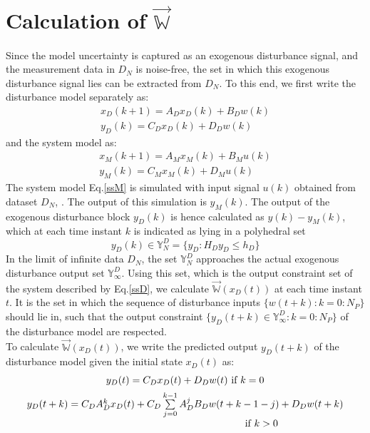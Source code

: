 \documentclass[letterpaper, 10 pt, conference]{ieeeconf}  %
\begin{document}
  \section{Calculation of $\vec{\mathbb{W}}$}
  \noindent
  Since the model uncertainty is captured as an exogenous disturbance signal, and the measurement data in $D_N$ is noise-free, the set in which this exogenous disturbance signal lies can be extracted from $D_N$. To this end, we first write 
  the disturbance model separately as:
  \begin{equation}
  \begin{matrix}
  x_D(k+1) = A_Dx_D(k)+B_Dw(k)  \\
  y_D(k) = C_Dx_D(k)+D_Dw(k)
  \end{matrix}
  \label{ssD}
  \end{equation}
  and the system model as:
  \begin{equation}
  \begin{matrix}
  x_M(k+1) = A_Mx_M(k)+B_Mu(k)  \\
  y_M(k) = C_Mx_M(k)+D_Mu(k)
  \end{matrix}
  \label{ssM}
  \end{equation}
	The system model Eq.\eqref{ssM} is simulated with input signal $u(k)$ obtained from dataset $D_N$, {\color{red}{with the initial condition $x_M(0)=0$}}.
	The output of this simulation is $y_M(k)$. The output of the exogenous disturbance block $y_D(k)$ is hence calculated as $y(k)-y_M(k)$, which at each time instant $k$ is indicated as lying in a polyhedral set
	\begin{equation}
	y_D(k) \in \mathbb{Y}^D_N = \{y_D:H_Dy_D \leq h_D\}
	\end{equation}
	In the limit of infinite data $D_N$, the set $\mathbb{Y}_N^D$ approaches the actual exogenous disturbance output set $\mathbb{Y}_{\infty}^D$. Using this set, which is the output constraint set of the system described by Eq.\eqref{ssD}, we calculate $\vec{\mathbb{W}}(x_D(t))$ at each time instant $t$. It is the set in which the sequence of disturbance inputs $\{w(t+k):k=0:N_P\}$ should lie in, such that the output constraint $\{y_D(t+k)\in \mathbb{Y}_{\infty}^D:k=0:N_P\}$ of the disturbance model are respected. \\
	To calculate $\vec{\mathbb{W}}(x_D(t))$, we write the predicted output $y_D(t+k)$ of the disturbance model given the initial state $x_D(t)$ as:
	\begin{equation}
	\small
	\begin{matrix}
	y_D(t)=C_Dx_D(t)+D_Dw(t) \text{ if } k=0 \vspace{5pt} \\
	y_D(t+k)=C_DA_D^{k}x_D(t)+ C_D\sum\limits_{j=0}^{k-1}A_D^jB_Dw(t+k-1-j)+D_Dw(t+k) \\ \hspace{150pt}\text{ if } k>0
	\end{matrix}
	\end{equation}
\end{document}
